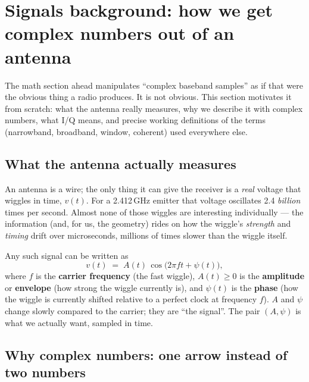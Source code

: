 \section{Signals background: how we get complex numbers out of an antenna}
\label{sec:iq}

The math section ahead manipulates ``complex baseband samples'' as if that
were the obvious thing a radio produces. It is not obvious. This section
motivates it from scratch: what the antenna really measures, why we describe
it with complex numbers, what I/Q means, and precise working definitions of
the terms (narrowband, broadband, window, coherent) used everywhere else.

\subsection{What the antenna actually measures}
\label{sec:antenna}

An antenna is a wire; the only thing it can give the receiver is a
\emph{real} voltage that wiggles in time, $v(t)$. For a 2.412\,GHz emitter
that voltage oscillates 2.4 \emph{billion} times per second. Almost none of
those wiggles are interesting individually --- the information (and, for us,
the geometry) rides on how the wiggle's \emph{strength} and \emph{timing}
drift over microseconds, millions of times slower than the wiggle itself.

Any such signal can be written as
\[
v(t) \;=\; A(t)\,\cos\!\big(2\pi f t + \psi(t)\big),
\]
where $f$ is the \textbf{carrier frequency} (the fast wiggle),
$A(t) \ge 0$ is the \textbf{amplitude} or \textbf{envelope} (how strong the
wiggle currently is), and $\psi(t)$ is the \textbf{phase} (how the wiggle is
currently shifted relative to a perfect clock at frequency $f$). $A$ and
$\psi$ change slowly compared to the carrier; they are ``the signal''. The
pair $(A, \psi)$ is what we actually want, sampled in time.

\subsection{Why complex numbers: one arrow instead of two numbers}

